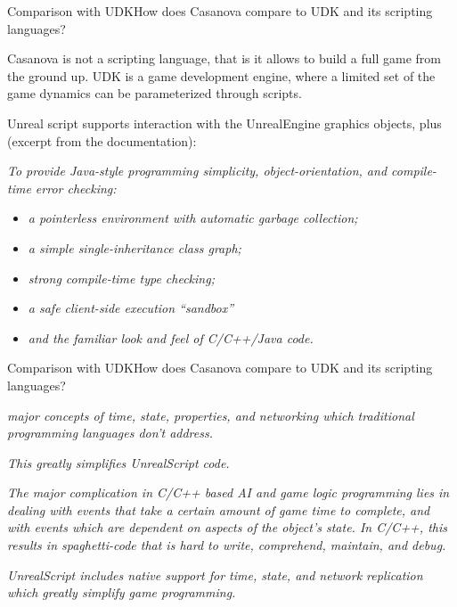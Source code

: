 \documentclass{beamer}
\begin{document}
\begin{slide}{Comparison with UDK}{How does Casanova compare to UDK and its scripting languages?}{
\item Casanova is not a scripting language, that is it allows to build a full game from the ground up. UDK is a game development engine, where a limited set of the game dynamics can be parameterized through scripts.
\item Unreal script supports interaction with the UnrealEngine graphics objects, plus (excerpt from the documentation):
\item \textit{To provide Java-style programming simplicity, object-orientation, and compile-time error checking:}
\begin{itemize}
\item \textit{a pointerless environment with automatic garbage collection;}
\item \textit{a simple single-inheritance class graph;}
\item \textit{strong compile-time type checking;}
\item \textit{a safe client-side execution ``sandbox''}
\item \textit{and the familiar look and feel of C/C++/Java code.}
\end{itemize}
}\end{slide}
\begin{slide}{Comparison with UDK}{How does Casanova compare to UDK and its scripting languages?}{
\item \textit{major concepts of time, state, properties, and networking which traditional programming languages don't address.}
\item \textit{This greatly simplifies UnrealScript code.}
\item \textit{The major complication in C/C++ based AI and game logic programming lies in dealing with events that take a certain amount of game time to complete, and with events which are dependent on aspects of the object's state. In C/C++, this results in spaghetti-code that is hard to write, comprehend, maintain, and debug.}
\item \textit{UnrealScript includes native support for time, state, and network replication which greatly simplify game programming.}
}\end{slide}
\end{document}
